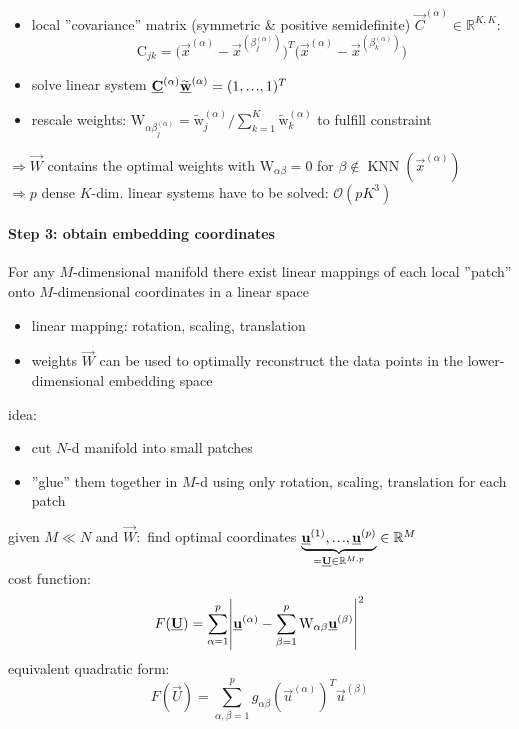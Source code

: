 \begin{itemize}
	\item local ''covariance'' matrix (symmetric \& positive semidefinite) $\vec{C}^{(\alpha)} \in \mathbb{R}^{K,K}:$ 
	\vspace{-0.2cm}
	\begin{equation*}
		\mathrm{C}_{jk} = \big( \vec{x}^{(\alpha)} - \vec{x}^{(\beta_j^{(\alpha)})} \big)^T\big( \vec{x}^{(\alpha)} - \vec{x}^{(\beta_k^{(\alpha)})} \big)
	\end{equation*} 
	\vspace{-0.5cm}
	\item solve linear system $\vec{C}^{(\alpha)}\widetilde{\vec{w}}^{(\alpha)} = (1, \mydots, 1)^T$
	\item rescale weights: $\mathrm{W}_{\alpha \beta_j^{(\alpha)}} = \widetilde{\mathrm{w}}_j^{(\alpha)} / \sum_{k=1}^{K} \widetilde{\mathrm{w}}_k^{(\alpha)}$ to fulfill constraint
\end{itemize}
\vspace{-0.2cm}
$\Rightarrow \vec{W}$ contains the optimal weights with $\mathrm{W}_{\alpha \beta} = 0$ for $\beta \notin \operatorname{KNN}(\vec{x}^{(\alpha)})$ \\\vspace{0.1cm}
$\Rightarrow p$ dense $K$-dim. linear systems have to be solved: \quad $\mathcal{O}(pK^3)$ 

\paragraph{Step 3: obtain embedding coordinates}
For any $M$-dimensional manifold there exist linear mappings of each local ''patch'' onto $M$-dimensional coordinates in a linear space
\begin{itemize}
	\item linear mapping: rotation, scaling, translation
	\item weights $\vec{W}$ can be used to optimally reconstruct the data points in the lower-dimensional embedding space
\end{itemize}
idea:
\begin{itemize}
	\item cut $N$-d manifold into small patches
	\item ''glue'' them together in $M$-d using only rotation, scaling, translation for each patch
\end{itemize}
given $M \ll N$ and $\vec{W}:$ find optimal coordinates $\underbrace{\vec{u}^{(1)}, \mydots, \vec{u}^{(p)}}_{=\vec{U} \in \mathbb{R}^{M,p}} \in \mathbb{R}^M$ \\
cost function: 
\begin{equation*}
F(\underline{\mathbf{U}}) = \sum_{\alpha=1}^{p} \abs{\underline{\mathbf{u}}^{(\alpha)} - \sum_{\beta=1}^{p} \mathrm{W}_{\alpha \beta} \underline{\mathbf{u}}^{(\beta)}}^2
\end{equation*}
equivalent quadratic form: 
\vspace{-0.4cm}
\begin{equation*}
F(\vec{U}) = \sum_{\alpha, \beta=1}^{p} g_{\alpha \beta} (\vec{u}^{(\alpha)})^T \vec{u}^{(\beta)}
\end{equation*}

